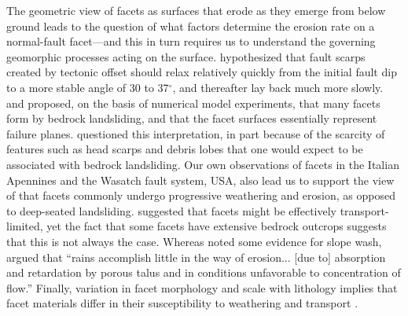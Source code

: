 The geometric view of facets as surfaces that erode as they emerge from below ground leads to the question of what factors determine the erosion rate on a normal-fault facet---and this in turn requires us to understand the governing geomorphic processes acting on the surface. \citet{wallace1978geometry} hypothesized that fault scarps created by tectonic offset should relax relatively quickly from the initial fault dip to a more stable angle of 30 to 37$^\circ$, and thereafter lay back much more slowly. \citet{densmore1998landsliding} and \citet{ellis1999development} proposed, on the basis of numerical model experiments, that many facets form by bedrock landsliding, and that the facet surfaces essentially represent failure planes. \citet{petit2009faceted} questioned this interpretation, in part because of the scarcity of features such as head scarps and debris lobes that one would expect to be associated with bedrock landsliding. Our own observations of facets in the Italian Apennines and the Wasatch fault system, USA, also lead us to support the view of \citet{petit2009faceted} that facets commonly undergo progressive weathering and erosion, as opposed to deep-seated landsliding. \citet{menges1990soils} suggested that facets might be effectively transport-limited, yet the fact that some facets have extensive bedrock outcrops suggests that this is not always the case. Whereas \citet{menges1990soils} noted some evidence for slope wash, \citet{gilbert1928studies} argued that ``rains accomplish little in the way of erosion... [due to] absorption and retardation by porous talus and in conditions unfavorable to concentration of flow.'' Finally, variation in facet morphology and scale with lithology implies that facet materials differ in their susceptibility to weathering and transport \citep{menges1990soils,zuchiewicz2000geometry}. 

